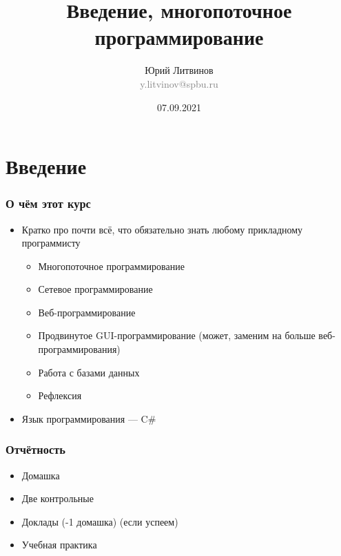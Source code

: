 \documentclass[xetex,mathserif,serif]{beamer}
\title{Введение, многопоточное программирование}
\author[Юрий Литвинов]{Юрий Литвинов\\\small{\textcolor{gray}{y.litvinov@spbu.ru}}}
\date{07.09.2021}
\begin{document}
    \frame{\titlepage}

    \section{Введение}

    \begin{frame}
        \frametitle{О чём этот курс}
        \begin{itemize}
            \item Кратко про почти всё, что обязательно знать любому прикладному программисту
            \begin{itemize}
                \item Многопоточное программирование
                \item Сетевое программирование
                \item Веб-программирование
                \item Продвинутое GUI-программирование (может, заменим на больше веб-программирования)
                \item Работа с базами данных
                \item Рефлексия
            \end{itemize}
            \item Язык программирования --- C\#
        \end{itemize}
    \end{frame}

    \begin{frame}
        \frametitle{Отчётность}
        \begin{itemize}
            \item Домашка
            \item Две контрольные
            \item Доклады (-1 домашка) (если успеем)
            \item Учебная практика
        \end{itemize}
    \end{frame}
\end{document}
